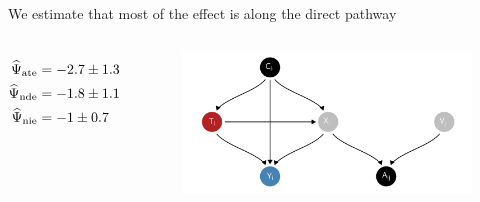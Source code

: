 \documentclass[aspectratio=169]{beamer}
\theoremstyle{remark}
\begin{document}
\begin{frame}{We estimate that most of the effect is along the direct pathway}

    \begin{columns}
        \begin{align*}
            \widehat{\Psi}_\mathrm{ate} & = -2.7 \pm 1.3 \\
            \widehat{\Psi}_\mathrm{nde} & = -1.8 \pm 1.1 \\
            \widehat{\Psi}_\mathrm{nie} & = -1 \pm 0.7
        \end{align*}

        \centering
        \begin{figure}[ht]
            \includegraphics[width=\textwidth]{figures/dags/bipartite-mediation.png}
        \end{figure}
    \end{columns}
\end{frame}
\end{document}
